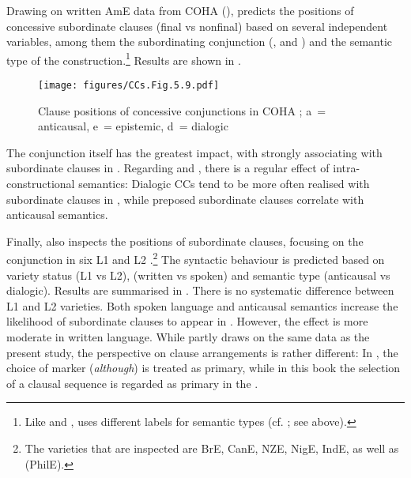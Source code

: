 Drawing on written AmE data from COHA (\citealt{Davies2010}), \citet{Schützler2019} predicts the positions of concessive subordinate clauses (final vs nonfinal) based on several independent variables, among them the subordinating conjunction (,  and ) and the semantic type of the construction.\footnote{Like \citet{Hilpert2013a} and \citet{Schützler2017, Schützler2018b}, \citet{Schützler2019} uses different labels for semantic types (cf. \citealt{Sweetser1990}; see  above).} Results are shown in .

\begin{figure}
\texttt{[image: figures/CCs.Fig.5.9.pdf]}
\caption{\label{bkm:Ref35862401}\label{fig:5.9}Clause positions of concessive conjunctions in COHA \citep[261]{Schützler2019}; a~= anticausal, e~= epistemic, d~= dialogic}
 \end{figure}

The conjunction itself has the greatest impact, with  strongly associating with subordinate clauses in . Regarding  and , there is a regular effect of intra-constructional semantics: Dialogic CCs tend to be more often realised with subordinate clauses in , while preposed subordinate clauses correlate with anticausal semantics.

Finally, \citet{Schützler2020b} also inspects the positions of subordinate clauses, focusing on the conjunction  in six L1 and L2 .\footnote{The varieties that are inspected are BrE, CanE, NZE, NigE, IndE, as well as  (PhilE).} The syntactic behaviour is predicted based on variety status (L1 vs L2),  (written vs spoken) and semantic type (anticausal vs dialogic). Results are summarised in . There is no systematic difference between L1 and L2 varieties. Both spoken language and anticausal semantics increase the likelihood of subordinate clauses to appear in . However, the effect is more moderate in written language. While \citet{Schützler2020b} partly draws on the same data as the present study, the perspective on clause arrangements is rather different: In \citet{Schützler2020b}, the choice of marker (\textit{although}) is treated as primary, while in this book the selection of a clausal sequence is regarded as primary in the .

